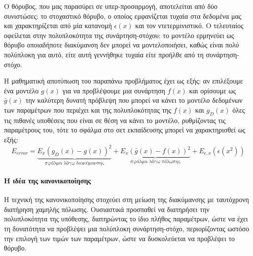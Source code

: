 Ο θόρυβος, που μας παρασύρει σε υπερ-προσαρμογή, αποτελείται από δύο συνιστώσες: το στοχαστικό θόρυβο, ο οποίος εμφανίζεται τυχαία στα δεδομένα μας και χαρακτηρίζεται από μία κατανομή $\epsilon(x)$ και τον ντετερμινιστικό. Ο τελευταίος οφείλεται στην πολυπλοκότητα της συνάρτηση-στόχου: το μοντέλο ερμηνεύει ως θόρυβο οποιαδήποτε διακύμανση δεν μπορεί να μοντελοποιήσει, καθώς είναι πολύ πολύπλοκη για αυτό, είτε αυτή γεννήθηκε τυχαία είτε προήλθε από τη συνάρτηση-στόχο.

Η μαθηματική αποτύπωση του παραπάνω προβλήματος έχει ως εξής: αν επιλέξουμε ένα μοντέλο $g(x)$ για να προβλέψουμε μια συνάρτηση $f(x)$ και ορίσουμε ως $\bar{g}(x)$ την καλύτερη δυνατή πρόβλεψη που μπορεί να κάνει το μοντέλο δεδομένων των παραμέτρων που περιέχει και της πολυπλοκότητας της $f(x)$ και $g_D(x)$ όλες τις πιθανές υποθέσεις που είναι σε θέση να κάνει το μοντέλο, ρυθμίζοντας τις παραμέτρους του, τότε το σφάλμα στο σετ εκπαίδευσης μπορεί να χαρακτηρισθεί ως εξής:
	\begin{equation}
	E_{error}=\underbrace{E_x(g_D(x) - g(x))^2}_{\text{σφάλμα λόγω  διακύμανσης}} + \underbrace{E_x(\bar{g}(x)- f(x))^2}_{\text{σφάλμα λόγω πόλωσης}} + E_{\epsilon,x}(\epsilon(x^2))
	\end{equation}
\paragraph{Η ιδέα της κανονικοποίησης} Η τεχνική της κανονικοποίησης στοχεύει στη μείωση της διακύμανσης με ταυτόχρονη διατήρηση χαμηλής πόλωσης. Ουσιαστικά προσπαθεί να διατηρήσει την πολυπλοκότητα της υπόθεσης, διατηρώντας το
ίδιο πλήθος παραμέτρων, ώστε να έχει τη δυνατότητα να προβλέψει μια πολύπλοκη συνάρτηση-στόχο, περιορίζοντας ωστόσο την επιλογή των τιμών των παραμέτρων, ώστε να δυσκολεύεται να προβλέψει το θόρυβο.



